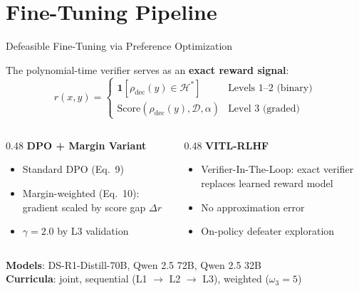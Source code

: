 \documentclass[aspectratio=169]{beamer}
\newcommand{\D}{\mathcal{D}}
\newcommand{\Hgold}{\mathcal{H}^{*}}
\begin{document}
\section{Fine-Tuning Pipeline}

\begin{frame}{Defeasible Fine-Tuning via Preference Optimization}

\small
The polynomial-time verifier serves as an \textbf{exact reward signal}:
\vspace{-0.3em}
\[
r(x, y) = \begin{cases}
    \mathbf{1}[\rho_{\mathrm{dec}}(y) \in \Hgold] & \text{Levels 1--2 (binary)} \\
    \mathrm{Score}(\rho_{\mathrm{dec}}(y), \D, \alpha) & \text{Level 3 (graded)}
\end{cases}
\]

\vspace{-0.3em}
\begin{columns}[T]
\begin{column}{0.48\textwidth}
\textbf{DPO + Margin Variant}
\begin{itemize}\setlength\itemsep{1pt}
    \item Standard DPO (Eq.\ 9)
    \item Margin-weighted (Eq.\ 10): gradient scaled by score gap $\Delta r$
    \item $\gamma = 2.0$ by L3 validation
\end{itemize}
\end{column}
\begin{column}{0.48\textwidth}
\textbf{VITL-RLHF}
\begin{itemize}\setlength\itemsep{1pt}
    \item Verifier-In-The-Loop: exact verifier replaces learned reward model
    \item No approximation error
    \item On-policy defeater exploration
\end{itemize}
\end{column}
\end{columns}

\vspace{0.3em}
\textbf{Models}: DS-R1-Distill-70B, Qwen 2.5 72B, Qwen 2.5 32B\\
\textbf{Curricula}: joint, sequential (L1 $\to$ L2 $\to$ L3), weighted ($\omega_3 = 5$)
\end{frame}
\end{document}
